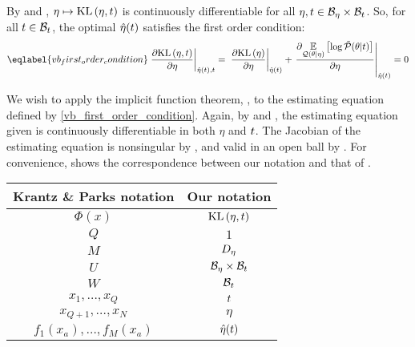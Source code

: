 \vspace{1em}


%
By  and , $\eta
\mapsto \mathrm{KL}\left(\eta, t\right)$ is continuously differentiable for all $\eta, t \in
\mathcal{B}_\eta \times \mathcal{B}_t$.  So, for all $t \in \mathcal{B}_t$, the optimal
$\hat\eta(t)$ satisfies the first order condition:
%
\begin{align}\eqlabel{vb_first_order_condition}
%
\fracat{\partial \KL{\eta, \t}}{ \partial \eta}{\etaopt(\t), \t} ={}
\fracat{\partial \KL{\eta}}{ \partial \eta}{\etaopt(\t)} +
\fracat{\partial
    \expect{\q(\theta \vert \eta)}{\log \ptil(\theta \vert \t)}}
    {\partial \eta}
    {\etaopt(\t)}
={} 0
%
\end{align}

We wish to apply the implicit function theorem, \citet[Theorem
3.3.1]{krantz:2012:implicit}, to the estimating equation defined by
\eqref{vb_first_order_condition}. Again, by 
and , the estimating equation given is continuously
differentiable in both $\eta$ and $t$. The Jacobian of the estimating equation
is nonsingular by , and valid in an open ball by
. For convenience,
 shows the correspondence between our notation and that
of \citet[Theorem 3.3.1]{krantz:2012:implicit}.

\begin{center}
\begin{tabular}{|c|c|}
%
\hline Krantz \& Parks notation & Our notation \\\hline
$\Phi(x)$                       & $\mathrm{KL}\left(\eta, t\right)$ \\\hline
$Q$                             & $1$ \\\hline
$M$                             & ${D_{\eta}}$ \\\hline
$U$                             & $\mathcal{B}_\eta \times \mathcal{B}_t$ \\\hline
$W$                             & $\mathcal{B}_t$ \\\hline
$x_1,\ldots,x_Q$                & $t$ \\\hline
$x_{Q+1},\ldots,x_N$            & $\eta$ \\\hline
$f_1(x_a), \ldots,f_M(x_a)$     & $\hat\eta(t)$ \\\hline
%
\end{tabular}
\end{center}

